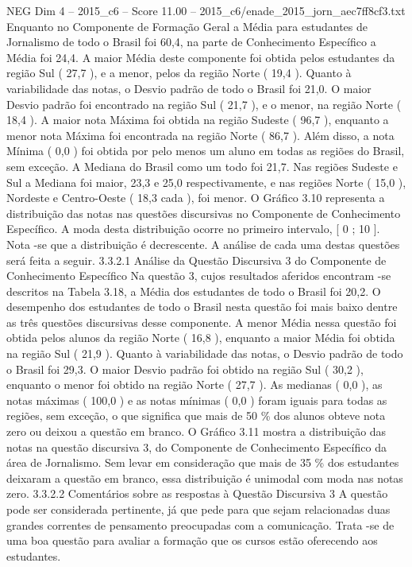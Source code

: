\begin{textsample}{NEG Dim 4 – 2015\_c6 – Score 11.00 – 2015\_c6/enade\_2015\_jorn\_aec7ff8cf3.txt}
Enquanto no Componente de Formação Geral a Média para estudantes de Jornalismo de todo o Brasil foi 60,4, na parte de Conhecimento Específico a Média foi 24,4.
A maior Média deste componente foi obtida pelos estudantes da região Sul ( 27,7 ), e a menor, pelos da região Norte ( 19,4 ).
Quanto à variabilidade das notas, o Desvio padrão de todo o Brasil foi 21,0.
O maior Desvio padrão foi encontrado na região Sul ( 21,7 ), e o menor, na região Norte ( 18,4 ).
A maior nota Máxima foi obtida na região Sudeste ( 96,7 ), enquanto a menor nota Máxima foi encontrada na região Norte ( 86,7 ).
Além disso, a nota Mínima ( 0,0 ) foi obtida por pelo menos um aluno em todas as regiões do Brasil, sem exceção.
A Mediana do Brasil como um todo foi 21,7.
Nas regiões Sudeste e Sul a Mediana foi maior, 23,3 e 25,0 respectivamente, e nas regiões Norte ( 15,0 ), Nordeste e Centro-Oeste ( 18,3 cada ), foi menor.
O Gráfico 3.10 representa a distribuição das notas nas questões discursivas no Componente de Conhecimento Específico.
A moda desta distribuição ocorre no primeiro intervalo, [ 0 ; 10 ].
Nota -se que a distribuição é decrescente.
A análise de cada uma destas questões será feita a seguir. 3.3.2.1 Análise da Questão Discursiva 3 do Componente de Conhecimento Específico Na questão 3, cujos resultados aferidos encontram -se descritos na Tabela 3.18, a Média dos estudantes de todo o Brasil foi 20,2.
O desempenho dos estudantes de todo o Brasil nesta questão foi mais baixo dentre as três questões discursivas desse componente.
A menor Média nessa questão foi obtida pelos alunos da região Norte ( 16,8 ), enquanto a maior Média foi obtida na região Sul ( 21,9 ).
Quanto à variabilidade das notas, o Desvio padrão de todo o Brasil foi 29,3.
O maior Desvio padrão foi obtido na região Sul ( 30,2 ), enquanto o menor foi obtido na região Norte ( 27,7 ).
As medianas ( 0,0 ), as notas máximas ( 100,0 ) e as notas mínimas ( 0,0 ) foram iguais para todas as regiões, sem exceção, o que significa que mais de 50 \% dos alunos obteve nota zero ou deixou a questão em branco.
O Gráfico 3.11 mostra a distribuição das notas na questão discursiva 3, do Componente de Conhecimento Específico da área de Jornalismo.
Sem levar em consideração que mais de 35 \% dos estudantes deixaram a questão em branco, essa distribuição é unimodal com moda nas notas zero. 3.3.2.2 Comentários sobre as respostas à Questão Discursiva 3 A questão pode ser considerada pertinente, já que pede para que sejam relacionadas duas grandes correntes de pensamento preocupadas com a comunicação.
Trata -se de uma boa questão para avaliar a formação que os cursos estão oferecendo aos estudantes.

\end{textsample}
